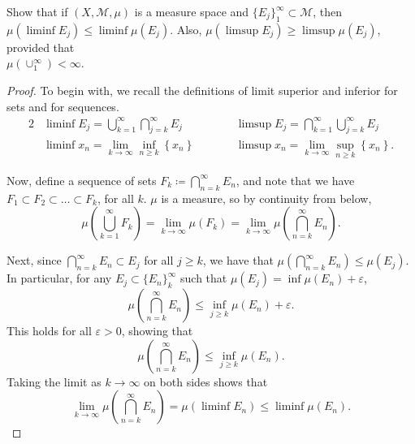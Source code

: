 \documentclass[12pt]{article}
\newenvironment{problem}[2][Problem]{\begin{trivlist}
    \item[\hskip \labelsep {\bfseries #1}\hskip \labelsep {\bfseries #2.}]}{\end{trivlist}}
\theoremstyle{definition}
\begin{document}
\begin{problem}{1.3.8}
	Show that if \( (X, \mathcal{M}, \mu) \) is a measure space and \( \{E_j\}_1^{\infty} \subset \mathcal{M} \), then\\ \(\mu(\liminf E_j) \leq \liminf \mu(E_j)\).
	Also, \(\mu(\limsup E_j) \geq \limsup \mu(E_j)\), provided that\\ \(\mu(\cup_1^{\infty}) < \infty\).
\end{problem}
\begin{proof}
	To begin with, we recall the definitions of limit superior and inferior for sets and for sequences.
	\begin{alignat}{2}
		\label{eq:1}
		 & \liminf E_j = \bigcup_{k=1}^{\infty} \bigcap_{j=k}^{\infty} E_j               & \qquad
		 & \limsup E_j = \bigcap_{k=1}^{\infty} \bigcup_{j=k}^{\infty} E_j                                                                                                 \\
		 & \liminf x_n = \lim_{k \rightarrow \infty} \inf_{n \geq k}\left\{ x_n \right\}
		 &                                                                               & \limsup x_n = \lim_{k \rightarrow \infty} \sup_{n \geq k} \left\{ x_n \right\}.
	\end{alignat}

	Now, define a sequence of sets \( F_k \coloneq \bigcap_{n=k}^{\infty} E_n \), and note that we have \( F_1 \subset F_2 \subset \dots \subset F_k \), for all \( k \).
	\(\mu\) is a measure, so by continuity from below,
	\begin{equation}
		\label{eq:2}
		\mu(\bigcup_{k=1}^{\infty} F_k) = \lim_{k \rightarrow \infty} \mu(F_k) = \lim_{k\rightarrow \infty} \mu(\bigcap_{n=k}^{\infty} E_n).
	\end{equation}

	Next, since \( \bigcap_{n=k}^{\infty} E_n \subset E_j \) for all \( j \geq k \), we have that \( \mu(\bigcap_{n=k}^{\infty} E_n) \leq \mu(E_j) \).
	In particular, for any \( E_j \subset \{E_{n}\}_k^{\infty} \) such that \(\mu(E_j) = \inf \mu(E_n) + \varepsilon\),
	\begin{equation}
		\label{eq:3}
		\mu(\bigcap_{n=k}^{\infty} E_n) \leq \inf_{j \geq k} \mu(E_n) + \varepsilon.
	\end{equation}
	This holds for all \(\varepsilon > 0\), showing that
	\begin{equation}
		\label{eq:4}
		\mu(\bigcap_{n=k}^{\infty} E_n) \leq \inf_{j \geq k} \mu(E_n).
	\end{equation}
	Taking the limit as \( k \rightarrow \infty \) on both sides shows that
	\begin{equation}
		\label{eq:5}
		\lim_{k\rightarrow \infty} \mu(\bigcap_{n=k}^{\infty} E_n) = \mu(\liminf E_n) \leq \liminf \mu(E_n).
	\end{equation}


\end{proof}
\end{document}
